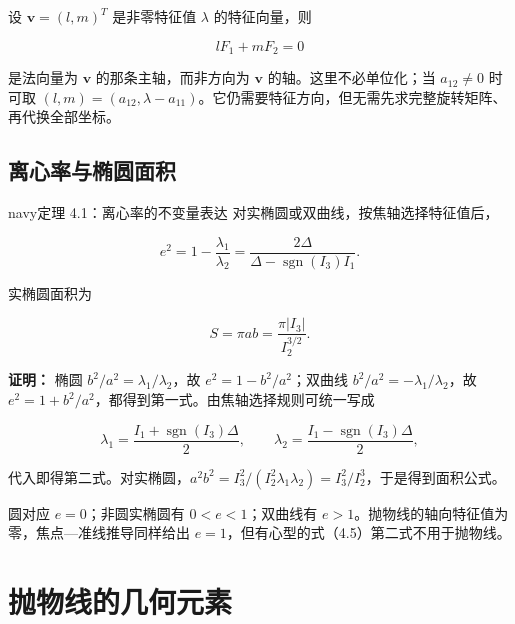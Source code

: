 \documentclass[11pt,a4paper]{article}
\begin{document}
设 \(\boldsymbol v=(l,m)^T\) 是非零特征值 \(\lambda\) 的特征向量，则

\begin{equation*}
lF_1+mF_2=0\tag{4.4}
\end{equation*}

是法向量为 \(\boldsymbol v\) 的那条主轴，而非方向为 \(\boldsymbol v\)
的轴。这里不必单位化；当 \(a_{12}\ne0\) 时可取
\((l,m)=(a_{12},\lambda-a_{11})\)。它仍需要特征方向，但无需先求完整旋转矩阵、再代换全部坐标。

\subsection{离心率与椭圆面积}\label{ux79bbux5fc3ux7387ux4e0eux692dux5706ux9762ux79ef}

\begin{sboxenv}{navy}{定理 4.1：离心率的不变量表达}
对实椭圆或双曲线，按焦轴选择特征值后，

\begin{equation*}
e^2=1-\frac{\lambda_1}{\lambda_2}=\frac{2\Delta}{\Delta-\operatorname{sgn}(I_3)I_1}.\tag{4.5}
\end{equation*}

实椭圆面积为

\begin{equation*}
S=\pi ab=\frac{\pi|I_3|}{I_2^{3/2}}.\tag{4.6}
\end{equation*}

\end{sboxenv}

\textbf{证明：} 椭圆 \(b^2/a^2=\lambda_1/\lambda_2\)，故
\(e^2=1-b^2/a^2\)；双曲线 \(b^2/a^2=-\lambda_1/\lambda_2\)，故
\(e^2=1+b^2/a^2\)，都得到第一式。由焦轴选择规则可统一写成

\begin{equation*}
\lambda_1=\frac{I_1+\operatorname{sgn}(I_3)\Delta}{2},\qquad \lambda_2=\frac{I_1-\operatorname{sgn}(I_3)\Delta}{2},
\end{equation*}

代入即得第二式。对实椭圆，\(a^2b^2=I_3^2/(I_2^2\lambda_1\lambda_2)=I_3^2/I_2^3\)，于是得到面积公式。

圆对应 \(e=0\)；非圆实椭圆有 \(0<e<1\)；双曲线有
\(e>1\)。抛物线的轴向特征值为零，焦点---准线推导同样给出
\(e=1\)，但有心型的式（4.5）第二式不用于抛物线。

\section{抛物线的几何元素}\label{ux629bux7269ux7ebfux7684ux51e0ux4f55ux5143ux7d20}
\end{document}
